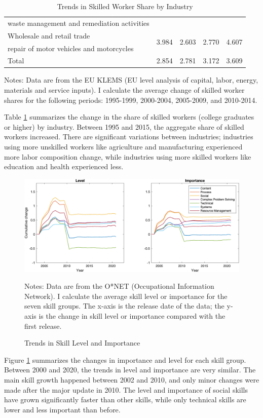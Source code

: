 \documentclass[12pt]{article}
\begin{document}
\begin{appendices}
\begin{table}[h!]
\begin{center}
\begin{tabular}{l|cccc}
waste management and remediation activities &&&&\\
Wholesale and retail trade & \multirow{2}{*}{3.984} & \multirow{2}{*}{2.603} & \multirow{2}{*}{2.770} & \multirow{2}{*}{4.607} \\
repair of motor vehicles and motorcycles &&&&\\
Total & 2.854  & 2.781 & 3.172  & 3.609 \\\hline
\end{tabular}
\end{center}
\caption{Trends in Skilled Worker Share by Industry}
\label{Industry_trend}
{\scriptsize Notes: Data are from the EU KLEMS (EU level analysis of capital, labor, energy, materials and service inputs). I calculate the average change of skilled worker shares for the following periods: 1995-1999, 2000-2004, 2005-2009, and 2010-2014.}
\end{table}

Table \ref{Industry_trend} summarizes the change in the share of skilled workers (college graduates or higher) by industry. Between 1995 and 2015, the aggregate share of skilled workers increased. There are significant variations between industries; industries using more unskilled workers like agriculture and manufacturing experienced more labor composition change, while industries using more skilled workers like education and health experienced less.

\begin{figure}[h!]
\includegraphics[width = \textwidth]{trend}
\caption{Trends in Skill Level and Importance}
\label{trend}
{\scriptsize Notes: Data are from the O*NET (Occupational Information Network). I calculate the average skill level or importance for the seven skill groups. The x-axis is the release date of the data; the y-axis is the change in skill level or importance compared with the first release. }
\end{figure}

Figure \ref{trend} summarizes the changes in importance and level for each skill group. Between 2000 and 2020, the trends in level and importance are very similar. The main skill growth happened between 2002 and 2010, and only minor changes were made after the major update in 2010. The level and importance of social skills have grown significantly faster than other skills, while only technical skills are lower and less important than before. 


\end{appendices}
\end{document}
